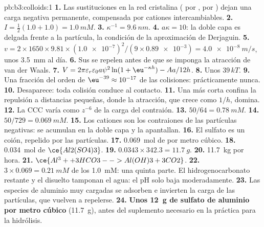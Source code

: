 \begin{solution}{pb:b3:colloids:1}
\textbf{1.} Las sustituciones en la red cristalina ( por ,  por ) dejan
una carga negativa permanente, compensada por cationes intercambiables.
\textbf{2.} $I = \frac12(1.0 + 1.0) = \qty{1.0}{mM}$.
\textbf{3.} $\kappa^{-1} = \qty{9.6}{nm}$.
\textbf{4.} $a\kappa = 10$: la doble capa es delgada frente a la partícula, la
condición de la aproximación de Derjaguin.
\textbf{5.} $v = 2 \times 1650 \times 9.81 \times (\num{1.0e-7})^2/(9 \times \num{0.89e-3}) = \qty{4.0e-8}{m/s}$, unos \qty{3.5}{mm} al día.
\textbf{6.} Sus  se repelen antes de que se imponga la atracción de van der Waals.
\textbf{7.} $V = 2\pi\varepsilon_r\varepsilon_0a\psi^2\ln(1 + \eu^{-\kappa h}) - Aa/12h$.
\textbf{8.} Unos $39\,kT$.
\textbf{9.} Una fracción del orden de $\eu^{-39} \approx 10^{-17}$ de las colisiones: prácticamente nunca.
\textbf{10.} Desaparece: toda colisión conduce al contacto.
\textbf{11.} Una  más corta confina la repulsión a distancias pequeñas, donde la
atracción, que crece como $1/h$, domina.
\textbf{12.} La CCC varía como $z^{-6}$ de la carga del contraión.
\textbf{13.} $50/64 = \qty{0.78}{mM}$.
\textbf{14.} $50/729 = \qty{0.069}{mM}$.
\textbf{15.} Los cationes son los contraiones de las partículas negativas: se
acumulan en la doble capa y la apantallan.
\textbf{16.} El sulfato es un coión, repelido por las partículas.
\textbf{17.} \qty{0.069}{mol} de  por metro cúbico.
\textbf{18.} \qty{0.034}{mol} de $\ce{Al2(SO4)3}$.
\textbf{19.} $0.0343 \times 342.3 = \qty{11.7}{g}$.
\textbf{20.} \qty{11.7}{kg} por hora.
\textbf{21.} $\ce{Al^3+ + 3 HCO3- -> Al(OH)3 + 3 CO2}$.
\textbf{22.} $3 \times 0.069 = \qty{0.21}{mM}$ de los \qty{1.0}{mM}: una quinta parte. El
hidrogenocarbonato restante y el  disuelto tamponan el agua: el pH solo baja
moderadamente.
\textbf{23.} Las especies de aluminio muy cargadas se adsorben e invierten la carga de las
partículas, que vuelven a repelerse.
\textbf{24.} \textbf{Unos \qty{12}{g} de sulfato de aluminio por metro cúbico} (\qty{11.7}{g}), antes del suplemento
necesario en la práctica para la hidrólisis.
\end{solution}
